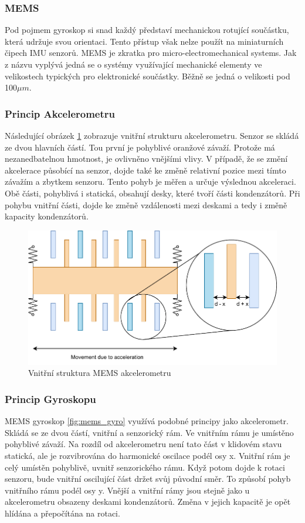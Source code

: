 \subsubsection*{MEMS}
Pod pojmem gyroskop si snad každý představí mechanickou rotující součástku, která udržuje svou orientaci. Tento přístup však nelze použít na miniaturních čipech IMU senzorů. MEMS je zkratka pro micro-electromechanical systems. Jak z názvu vyplývá jedná se o systémy využívající mechanické elementy ve velikostech typických pro elektronické součástky. Běžně se jedná o velikosti pod 100$\mu m$. \cite[str:~2-3]{mems_acc}

\subsubsection*{Princip Akcelerometru}
Následující obrázek \ref{fig:mems_acc} zobrazuje vnitřní strukturu akcelerometru. Senzor se skládá ze dvou hlavních částí. Tou první je pohyblivé oranžové závaží. Protože má nezanedbatelnou hmotnost, je ovlivněno vnějšími vlivy. V případě, že se změní akcelerace působící na senzor, dojde také ke změně relativní pozice mezi tímto závažím a zbytkem senzoru. Tento pohyb je měřen a určuje výslednou akceleraci. Obě části, pohyblivá i statická, obsahují desky, které tvoří části kondenzátorů. Při pohybu vnitřní části, dojde ke změně vzdálenosti mezi deskami a tedy i změně kapacity kondenzátorů. \cite[str:~4-5]{mems_acc}

\begin{figure}[h!]
	\centering
	\includegraphics[scale=0.8]{obrazky-figures/accelerometer.pdf}
	\caption{Vnitřní struktura MEMS akcelerometru}
	\label{fig:mems_acc}
\end{figure}

\subsubsection{Princip Gyroskopu}
MEMS gyroskop \ref{fig:mems_gyro} využívá podobné principy jako akcelerometr. Skládá se ze dvou částí, vnitřní a senzorický rám. Ve vnitřním rámu je umístěno pohyblivé závaží. Na rozdíl od akcelerometru není tato část v klidovém stavu statická, ale je rozvibrována do harmonické oscilace podél osy x.
Vnitřní rám je celý umístěn pohyblivě, uvnitř senzorického rámu. Když potom dojde k rotaci senzoru, bude vnitřní oscilující část držet svůj původní směr. To způsobí pohyb vnitřního rámu podél osy y. Vnější a vnitřní rámy jsou stejně jako u akcelerometru obsazeny deskami kondenzátorů. Změna v jejich kapacitě je opět hlídána a přepočítána na rotaci. \cite{mems_gyro}


